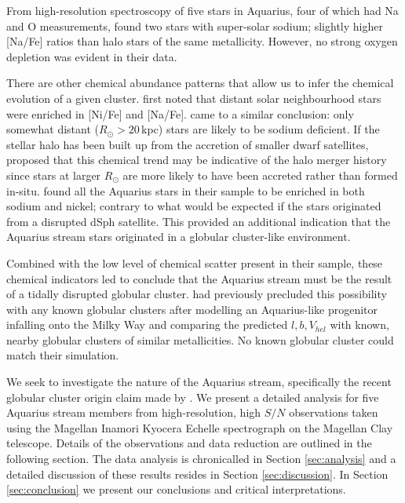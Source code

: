 \documentclass{emulateapj}
\begin{document}
From high-resolution spectroscopy of five stars in Aquarius, four of which had Na and O measurements, \citet{wylie-de-boer;et-al_2012} found two stars with super-solar sodium; slightly higher [Na/Fe] ratios than halo stars of the same metallicity. However, no strong oxygen depletion was evident in their data.

There are other chemical abundance patterns that allow us to infer the chemical evolution of a given cluster. \citet{nissen;schuster_1997} first noted that distant solar neighbourhood stars were enriched in [Ni/Fe] and [Na/Fe]. \citet{fulbright_2000} came to a similar conclusion: only somewhat distant ($R_\odot > 20$\,kpc) stars are likely to be sodium deficient. If the stellar halo has been built up from the accretion of smaller dwarf satellites, \citet{nissen;schuster_1997} proposed that this chemical trend may be indicative of the halo merger history since stars at larger $R_\odot$ are more likely to have been accreted rather than formed in-situ. \citet{wylie-de-boer;et-al_2012} found all the Aquarius stars in their sample to be enriched in both sodium and nickel; contrary to what would be expected if the stars originated from a disrupted dSph satellite. This provided an additional indication that the Aquarius stream stars originated in a globular cluster-like environment.

Combined with the low level of chemical scatter present in their sample, these chemical indicators led \citet{wylie-de-boer;et-al_2012} to conclude that the Aquarius stream must be the result of a tidally disrupted globular cluster. \citet{williams;et-al_2011} had previously precluded this possibility with any known globular clusters after modelling an Aquarius-like progenitor infalling onto the Milky Way and comparing the predicted $l, b, V_{hel}$ with known, nearby globular clusters of similar metallicities. No known globular cluster could match their simulation. 

We seek to investigate the nature of the Aquarius stream, specifically the recent globular cluster origin claim made by \citet{wylie-de-boer;et-al_2012}. We present a detailed analysis for five  Aquarius stream members from high-resolution, high $S/N$ observations taken using the Magellan Inamori Kyocera Echelle spectrograph \citep{bernstein;et-al_2003} on the Magellan Clay telescope. Details of the observations and data reduction are outlined in the following section. The data analysis is chronicalled in Section \ref{sec:analysis} and a detailed discussion of these results resides in Section \ref{sec:discussion}. In Section \ref{sec:conclusion} we present our conclusions and critical interpretations.
\end{document}
